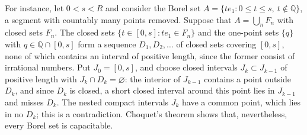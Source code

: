 For instance, let $0<s<R$ and consider the Borel set $A=\{te_1:0\leq t\leq s,\ t\notin\mathbb Q\}$, a segment with countably many points removed. Suppose that $A=\bigcup_nF_n$ with closed sets $F_n$. The closed sets $\{t\in[0,s]:te_1\in F_n\}$ and the one-point sets $\{q\}$ with $q\in\mathbb Q\cap[0,s]$ form a sequence $D_1,D_2,\ldots$ of closed sets covering $[0,s]$, none of which contains an interval of positive length, since the former consist of irrational numbers. Put $J_0=[0,s]$, and choose closed intervals $J_k\subset J_{k-1}$ of positive length with $J_k\cap D_k=\varnothing$: the interior of $J_{k-1}$ contains a point outside $D_k$, and since $D_k$ is closed, a short closed interval around this point lies in $J_{k-1}$ and misses $D_k$. The nested compact intervals $J_k$ have a common point, which lies in no $D_k$; this is a contradiction. Choquet's theorem shows that, nevertheless, every Borel set is capacitable.

